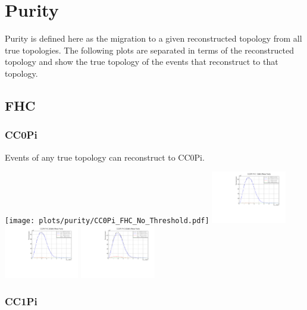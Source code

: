\section{Purity}

Purity is defined here as the migration to a given reconstructed topology from all true topologies.  The following plots are separated in terms of the reconstructed topology and show the true topology of the events that reconstruct to that topology.

\subsection{FHC}

\subsubsection{CC0Pi}

Events of any true topology can reconstruct to CC0Pi.

\begin{center}

\texttt{[image: plots/purity/CC0Pi\_FHC\_No\_Threshold.pdf]}
\includegraphics[width=0.245\textwidth]{plots/purity/CC0Pi_FHC_10MeV.pdf} 
\includegraphics[width=0.245\textwidth]{plots/purity/CC0Pi_FHC_20MeV.pdf}
\includegraphics[width=0.245\textwidth]{plots/purity/CC0Pi_FHC_50MeV.pdf}

\end{center}

\subsubsection{CC1Pi}

